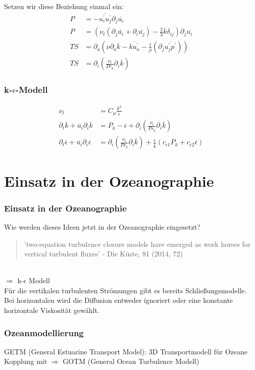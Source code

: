\documentclass[11pt,t]{beamer}
\newcommand*\mean[1]{\overline{#1}}
\begin{document}
\begin{frame}
Setzen wir diese Beziehung einmal ein:
\begin{align*}
P &= -\mean{u_i^{'}u_j^{'}}\partial_j\mean{u_i}\\
P &= (\nu_t(\partial_j \bar{u_i} + \partial_i \bar{u_j})-\frac{2}{3}\mean{k}\delta_{ij})\partial_j\mean{u_i}\\
TS &= \partial_a (\nu\partial_a\overline{k} -\overline{k u_a^{'}}-\frac{1}{\rho}(\partial_j\overline{u_j^{'}p^{'}}))\\
TS &= \partial_i(\frac{\nu_t}{Pr_k} \partial_i \mean{k})
\end{align*}
\end{frame}

\begin{frame}
\frametitle{k-$\epsilon$-Modell}
\begin{align*}
\nu_t &= C_\mu \frac{k^2}{\epsilon}\\
\partial_t \mean{k}+ \mean{u_i}\partial_i \mean{k} &= P_k - \mean{\epsilon} + \partial_i(\frac{\nu_t}{Pr_k} \partial_i \mean{k})\\
\partial_t \mean{\epsilon}+ \mean{u_i}\partial_i \mean{\epsilon} &= \partial_i(\frac{\nu_t}{Pr_k} \partial_i \mean{k}) + \frac{\epsilon}{\mean{k}}(c_{\epsilon 1}P_{k}+c_{\epsilon 2}\mean{\epsilon})
\end{align*}
\end{frame}

\section{Einsatz in der Ozeanographie}
\begin{frame}
\frametitle{Einsatz in der Ozeanographie}
Wie werden dieses Ideen jetzt in der Ozeanographie eingesetzt?
\begin{quote}
'two-equation turbulence closure models have emerged as work horses for vertical turbulent fluxes' - Die Küste, 81 (2014, 72)
\end{quote}
\\
$\Rightarrow$ k-$\epsilon$ Modell\\
\vspace{1cm}
Für die vertikalen turbulenten Strömungen gibt es bereits Schließungsmodelle.
Bei horizontalen wird die Diffusion entweder ignoriert oder eine konstante horizontale Viskosität gewählt.
\end{frame}
\begin{frame}
\frametitle{Ozeanmodellierung}
GETM  (General Estuarine Transport Model): 3D Transportmodell für Ozeane\\
\pause
Kopplung mit $\Rightarrow$ GOTM (General Ocean Turbulence Modell)

\end{frame}





\end{document}
